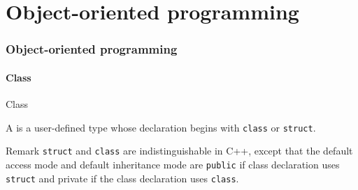 \part{Object-oriented programming}
\label{part:oop}

\section{Object-oriented programming}

\subsection{Class}

\begin{frame}{Class}{}
  \begin{definition}[Class]
    A  is a user-defined type whose declaration begins with \lstinline!class! or \lstinline!struct!.
  \end{definition}

  \begin{block}{Remark}
    \lstinline!struct! and \lstinline!class! are indistinguishable in C++, except that the default access mode and default inheritance mode are \lstinline!public! if class declaration uses \lstinline!struct! and private if the class declaration uses \lstinline!class!.
  \end{block}
\end{frame}


